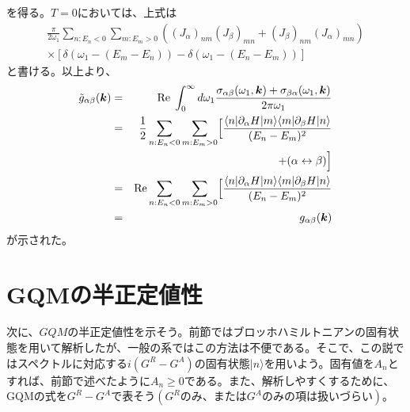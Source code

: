 \documentclass[12pt]{jsbook}
\newcommand{\ra}{\rangle}
\newcommand{\bk}{\bm{k}}
\begin{document}
を得る。$T=0$においては、上式は
\begin{eqnarray}
\frac{\pi}{2\omega_1}\displaystyle \sum_{n:E_n<0}\displaystyle \sum_{m:E_m>0}((J_\alpha)_{nm}(J_\beta)_{mn}+(J_\beta )_{nm}(J_\alpha)_{mn})\nonumber \\
\times [\delta(\omega_1-(E_m-E_n))-\delta(\omega_1-(E_n-E_m))]
\end{eqnarray}
と書ける。以上より、
\begin{eqnarray}
\tilde{g}_{\alpha\beta}(\bk) &=& \mathrm{Re} \;\int_{0}^{\infty}d\omega_1\frac{\sigma_{\alpha\beta}(\omega_1,\bk) + \sigma_{\beta{\alpha}}(\omega_1,\bk)}{2\pi\omega_1}\\
&=& \frac{1}{2}\displaystyle \sum_{n:E_n<0}\displaystyle \sum_{m:E_m>0} \Bigl[\frac{\langle n|\partial_\alpha H |m\rangle\langle m|\partial_\beta H |n\rangle}{(E_n-E_m)^2}\nonumber\\
&& \ \ \ \ \ \  + (\alpha \leftrightarrow \beta)\Bigr]\nonumber\\
&=& \mathrm{Re} \displaystyle \sum_{n:E_n<0}\displaystyle \sum_{m:E_m>0} \Bigl[\frac{\langle n|\partial_\alpha H |m\rangle\langle m|\partial_\beta H |n\rangle}{(E_n-E_m)^2}\\
&=&{g}_{\alpha\beta}(\bk)\label{existing}
\end{eqnarray}
が示された。
\section{GQMの半正定値性}
次に、$GQM$の半正定値性を示そう。前節ではブロッホハミルトニアンの固有状態を用いて解析したが、一般の系ではこの方法は不便である。そこで、この説ではスペクトルに対応する$i(G^{R} - G^{A})$の固有状態$|n\ra$を用いよう。固有値を$A_n$とすれば、前節で述べたように$A_n\geq 0$である。また、解析しやすくするために、GQMの式を$G^R-G^A$で表そう$(G^Rのみ、またはG^Aのみの項は扱いづらい)$。
\end{document}
